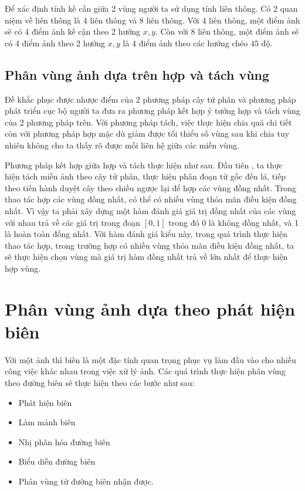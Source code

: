 \documentclass[12pt,oneside,a4]{report}
\begin{document}
Để xác định tính kế cần giữa 2 vùng người ta sử dụng tính liên thông. Có 2 quan niệm về liên thông là 4 liên thông và 8 liên thông. Với 4 liên thông,  một điểm ảnh sẽ có 4 điểm ảnh kế cận theo 2 hướng $x,y$. Còn với 8 liên thông, một điểm ảnh sẽ có 4 điểm ảnh theo 2 hướng $x,y$ là 4 điểm ảnh theo các hướng chéo $45$ độ.
\subsection{Phân vùng ảnh dựa trên hợp và tách vùng}
Đề khắc phục được nhược điểm của 2 phương pháp cây tứ phân và phương pháp phát triển cục bộ người ta đưa ra phương pháp kết hợp ý tưởng hợp và tách vùng của 2 phương pháp trên. Với phương pháp tách, việc thực hiện chia quá chi tiết còn với phương pháp hợp mặc dù giảm được tối thiểu số vùng sau khi chia tuy nhiên không cho ta thấy rõ được mối liên hệ giữa các miền vùng.

Phương pháp kết hợp giữa hợp và tách thực hiện như sau. Đầu tiên , ta thực hiện tách miền ảnh theo cây tứ phân, thực hiện phân đoạn từ gốc đến lá, tiếp theo tiến hành duyệt cây theo chiều ngược lại để hợp các vùng đồng nhất. Trong thao tác hợp các vùng đồng nhất, có thể có nhiều vùng thỏa mãn điều kiện đồng nhất. Vì vậy ta phải xây dựng một hàm đánh giá giá trị đồng nhất của các vùng với nhau trả về các giá trị trong đoạn $[0,1]$ trong  đó 0 là không đồng nhất, và 1 là hoàn toàn đồng nhất. Với hàm đánh giá kiểu này,  trong quá trình thực hiện thao tác hợp, trong trường hợp có nhiều vùng thỏa mãn điều kiện đồng nhất, ta sẽ thực hiện chọn vùng mà giá trị hàm đồng nhất trả về lớn nhất để thực hiện hợp vùng.
\section{Phân vùng ảnh dựa theo phát hiện biên}
Với một ảnh thì biên là một đặc tính quan trọng phục vụ làm đầu vào cho nhiều công việc khác nhau trong việc xử lý ảnh. 
Các quá trình thực hiện phân vùng theo đường biên sẽ thực hiện theo các bước như sau:
\begin{itemize}
\item Phát hiện biên
\item Làm mảnh biên
\item Nhị phân hóa đường biên
\item Biểu diễn đường biên
\item Phân vùng từ đường biên nhận được.
\end{itemize}
\end{document}
